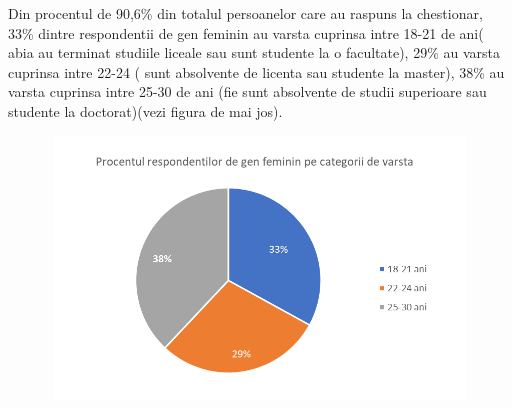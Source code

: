 \documentclass[a4paper, 12pt]{article}
\begin{document}
	\quad Din procentul de 90,6\% din totalul persoanelor care au raspuns la chestionar, 33\% dintre respondentii de gen feminin au varsta cuprinsa intre 18-21 de ani( abia au terminat studiile liceale sau sunt studente la o facultate), 29\% au varsta cuprinsa intre 22-24 ( sunt absolvente de licenta sau studente la master), 38\% au varsta cuprinsa intre 25-30 de ani (fie sunt absolvente de studii superioare sau studente la doctorat)(vezi figura de mai jos).
		\begin{figure}[!htb]
		\centering
		\includegraphics[width=12cm, height=7cm]{"figures/ana.png"}
	\end{figure}
	
\end{document}
